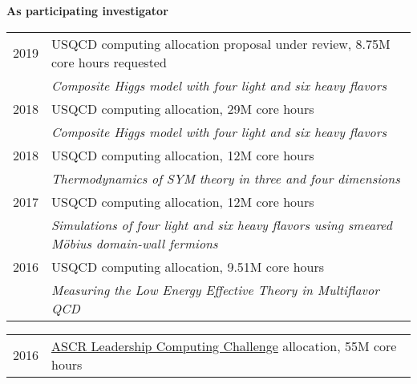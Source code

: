 \begin{spacelistout}
  \vspace{18 pt}
  \item {\large \bfseries As participating investigator} \\[10 pt]
    \begin{tabular}[t]{cl}
      2019 & USQCD computing allocation proposal under review, 8.75M core hours requested                                                                      \\ %
           & \textit{Composite Higgs model with four light and six heavy flavors}                                                                              \\[6 pt]
      2018 & USQCD computing allocation, 29M core hours                                                                                                        \\ %
           & \textit{Composite Higgs model with four light and six heavy flavors}                                                                              \\[6 pt]
      2018 & USQCD computing allocation, 12M core hours                                                                                                        \\ %
           & \textit{Thermodynamics of SYM theory in three and four dimensions}                                                                                \\[6 pt]
      2017 & USQCD computing allocation, 12M core hours                                                                                                        \\ %
           & \textit{Simulations of four light and six heavy flavors using smeared M\"obius domain-wall fermions}                                              \\[6 pt]
      2016 & USQCD computing allocation, 9.51M core hours                                                                                                      \\ %
           & \textit{Measuring the Low Energy Effective Theory in Multiflavor QCD}                                                                             \\[6 pt]
    \end{tabular} %
    \begin{tabular}[t]{cl}
      2016 & \href{https://science.energy.gov/ascr/facilities/accessing-ascr-facilities/alcc/}{ASCR Leadership Computing Challenge} allocation, 55M core hours \\ %

\end{tabular}
\end{spacelistout}
